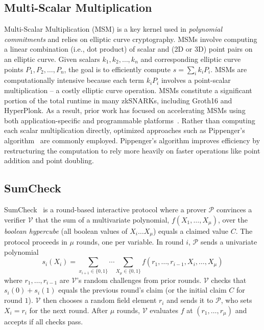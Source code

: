 \subsection{Multi-Scalar Multiplication}
Multi-Scalar Multiplication (MSM) is a key kernel used in \textit{polynomial commitments} and relies on elliptic curve cryptography.
MSMs involve computing a linear combination (i.e., dot product) of scalar and (2D or 3D) point pairs on an elliptic curve.
Given scalars \( k_1, k_2, \ldots, k_n \) and corresponding elliptic curve points \( P_1, P_2, \ldots, P_n \), the goal is to efficiently compute $s = \sum_i k_iP_i$.
MSMs are computationally intensive because each term \( k_iP_i \) involves a point-scalar multiplication -- a costly elliptic curve operation. 
MSMs constitute a significant portion of the total runtime in many zkSNARKs, including Groth16 and HyperPlonk. 
As a result, prior work has focused on accelerating MSMs using both application-specific and programmable platforms~\cite{szkp, pipezk, cuzk, gzkp, distmsm, priormsm, rezk}.
Rather than computing each scalar multiplication directly, optimized approaches such as Pippenger’s algorithm~\cite{pippenger} are commonly employed.
Pippenger’s algorithm improves efficiency by restructuring the computation to rely more heavily on faster operations like point addition and point doubling.

\subsection{SumCheck}
\label{sec:sumcheck_intro}
SumCheck~\cite{sumcheck} is a round-based interactive protocol where a prover $\mathcal{P}$ convinces a verifier $\mathcal{V}$ that the sum of a multivariate polynomial, $f(X_1, \ldots,X_\mu)$, over the \textit{boolean hypercube} (all boolean values of $X_i \ldots X_\mu$) equals a claimed value $C$.
The protocol proceeds in $\mu$ rounds, one per variable. 
In round $i$, $\mathcal{P}$ sends a univariate polynomial
\begin{equation*}
    s_i(X_i) = \sum_{x_{i+1} \in \{0,1\}} \cdots \sum_{X_\mu \in \{0,1\}} 
    f(r_1, \ldots, r_{i-1}, X_i, \ldots, X_\mu)
\end{equation*}
where $r_1, \ldots, r_{i-1}$ are $\mathcal{V}$’s random challenges from prior rounds. $\mathcal{V}$ checks that $s_i(0) + s_i(1)$ equals the previous round's claim (or the initial claim $C$ for round $1$).
$\mathcal{V}$ then chooses a random field element $r_i$ and sends it to $\mathcal{P}$, who sets $X_i = r_i$ for the next round.
After $\mu$ rounds, $\mathcal{V}$ evaluates $f$ at $(r_1, \ldots, r_\mu)$ and accepts if all checks pass.

